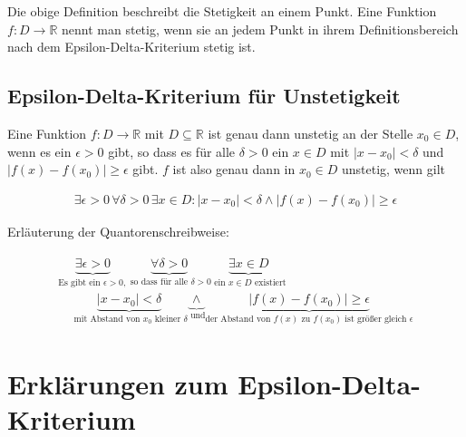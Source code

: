 \documentclass[fontsize=9pt,
               parskip=half-,
               DIV=14,
               listof=chapterentry,
               tocflat]{scrbook}
\begin{document}
Die obige Definition beschreibt die Stetigkeit an einem Punkt. Eine Funktion $f:D\to \mathbb {R} $ nennt man stetig, wenn sie an jedem Punkt in ihrem Definitionsbereich nach dem Epsilon-Delta-Kriterium stetig ist.

\subsection{Epsilon-Delta-Kriterium für Unstetigkeit}



\begin{definition*}
Eine Funktion $f:D\to \mathbb {R} $ mit $D\subseteq \mathbb {R} $ ist genau dann unstetig an der Stelle $x_{0}\in D$, wenn es ein $\epsilon >0$ gibt, so dass es für alle $\delta >0$ ein $x\in D$ mit $|x-x_{0}|<\delta $ und $|f(x)-f(x_{0})|\geq \epsilon $ gibt. $f$ ist also genau dann in $x_{0}\in D$ unstetig, wenn gilt

\begin{align*}
\exists \epsilon >0\,\forall \delta >0\,\exists x\in D:|x-x_{0}|<\delta \land |f(x)-f(x_{0})|\geq \epsilon 
\end{align*}

\end{definition*}



Erläuterung der Quantorenschreibweise:

\begin{align*}
{\begin{array}{l}\underbrace {{\underset {}{}}\exists \epsilon >0} _{{\text{Es gibt ein }}\epsilon >0,}\underbrace {{\underset {}{}}\forall \delta >0} _{{\text{ so dass für alle }}\delta >0}\underbrace {{\underset {}{}}\exists x\in D} _{{\text{ ein }}x\in D{\text{ existiert}}}\\[1em]\quad \underbrace {{\underset {}{}}|x-x_{0}|<\delta } _{{\text{ mit Abstand von }}x_{0}{\text{ kleiner }}\delta }\underbrace {{\underset {}{}}\land } _{\text{ und}}\underbrace {{\underset {}{}}|f(x)-f(x_{0})|\geq \epsilon } _{{\text{der Abstand von }}f(x){\text{ zu }}f(x_{0}){\text{ ist größer gleich }}\epsilon }\end{array}}
\end{align*}

\section{Erklärungen zum Epsilon-Delta-Kriterium}
\end{document}
